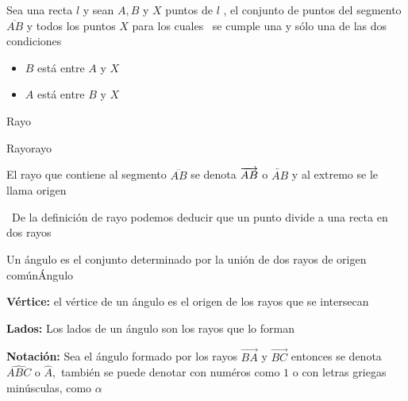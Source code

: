 \begin{definicion}{Sea una recta $l$ y sean $A,B$ y $X$ puntos de $l$ , el conjunto de puntos
del segmento $\overline{AB}$ y todos los puntos $X$ para los cuales \ se
cumple una y s\'{o}lo una de las dos condiciones

\begin{itemize}
\item $B$ est\'{a} entre $A$ y $X$

\item $A$ est\'{a} entre $B$ y $X$
\end{itemize}}{Rayo}
\begin{figura}{
}{Rayo}{rayo}
 \end{figura}
El rayo que contiene al segmento $\overline{AB}$ se denota $\overrightarrow{%
AB}$ o $\overleftarrow{AB}$ y al extremo se le llama origen

\nota\, De la definici\'{o}n de rayo podemos deducir que un punto divide a
una recta en dos rayos
\end{definicion}
\begin{definicion}{Un \'{a}ngulo es el conjunto determinado por la unión de dos
rayos de origen
com\'{u}n}{Ángulo}
\begin{lista}
 \item \textbf{V\'{e}rtice:} el v\'{e}rtice de un \'{a}ngulo es el origen de los rayos
que se intersecan
\item \textbf{Lados:} Los lados de un \'{a}ngulo son los rayos que lo forman
\item \textbf{Notación:} Sea el \'{a}ngulo formado por los rayos $\overrightarrow{BA}$ y $%
 \overrightarrow{BC}$ entonces se denota $\widehat{ABC}$ o $\widehat{A},$
 tambi\'{e}n se puede denotar con num\'{e}ros como $1$ o con letras
 griegas min\'{u}sculas, como $\alpha $
\end{lista}
\end{definicion}

